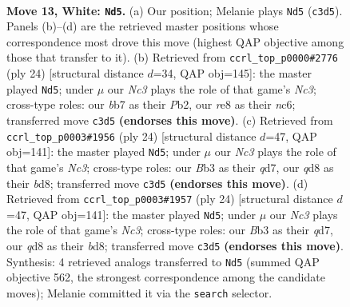 \documentclass[11pt]{article}
\begin{document}
\clearpage

\begin{figure}[p]\centering
\begin{subfigure}{0.46\textwidth}\centering
\resizebox{\linewidth}{!}{%
\newchessgame
\chessboard[
  setfen={r2qrbk1/1bp2pp1/p1np1n1p/1p2p3/4P3/PBNP1N1P/1PPB1PP1/R2QR1K1 w - - 3 13},
  showmover=false,
  pgfstyle=straightmove, color=movearrow, markmove={c3-d5}
]}
\caption{}
\end{subfigure}\hfill
\begin{subfigure}{0.46\textwidth}\centering
\resizebox{\linewidth}{!}{%
\newchessgame
\chessboard[
  setfen={r3r1k1/1bpqbpp1/p1np1n1p/1p2p3/4P3/PBNP1N1P/1PPB1PP1/R2QR1K1 w - - 0 13},
  showmover=false,
  pgfstyle=straightmove, color=movearrow, markmove={c3-d5}
]}
\caption{}
\end{subfigure}
\\[4pt]
\begin{subfigure}{0.46\textwidth}\centering
\resizebox{\linewidth}{!}{%
\newchessgame
\chessboard[
  setfen={r2br1k1/1bpq1ppp/p1np1n2/1p2p3/4P3/PBNP1N1P/1PPB1PP1/R2QR1K1 w - - 3 13},
  showmover=false,
  pgfstyle=straightmove, color=movearrow, markmove={c3-d5}
]}
\caption{}
\end{subfigure}\hfill
\begin{subfigure}{0.46\textwidth}\centering
\resizebox{\linewidth}{!}{%
\newchessgame
\chessboard[
  setfen={r2br1k1/1bpq1ppp/p1np1n2/1p2p3/4P3/PBNP1N1P/1PPB1PP1/R2QR1K1 w - - 3 13},
  showmover=false,
  pgfstyle=straightmove, color=movearrow, markmove={c3-d5}
]}
\caption{}
\end{subfigure}
\caption{\textbf{Move 13, White: \texttt{Nd5}.} (a) Our position; Melanie plays \texttt{Nd5} (\texttt{c3d5}). Panels (b)--(d) are the retrieved master positions whose correspondence most drove this move (highest QAP objective among those that transfer to it). (b) Retrieved from \texttt{ccrl\_top\_p0000\#2776} (ply 24) [structural distance $d$=34, QAP obj=145]: the master played \texttt{Nd5}; under $\mu$ our \emph{Nc3} plays the role of that game's \emph{Nc3}; cross-type roles: our \emph{b}b7 as their \emph{P}b2, our \emph{r}e8 as their \emph{n}c6; transferred move \texttt{c3d5} \textbf{(endorses this move)}. (c) Retrieved from \texttt{ccrl\_top\_p0003\#1956} (ply 24) [structural distance $d$=47, QAP obj=141]: the master played \texttt{Nd5}; under $\mu$ our \emph{Nc3} plays the role of that game's \emph{Nc3}; cross-type roles: our \emph{B}b3 as their \emph{q}d7, our \emph{q}d8 as their \emph{b}d8; transferred move \texttt{c3d5} \textbf{(endorses this move)}. (d) Retrieved from \texttt{ccrl\_top\_p0003\#1957} (ply 24) [structural distance $d$=47, QAP obj=141]: the master played \texttt{Nd5}; under $\mu$ our \emph{Nc3} plays the role of that game's \emph{Nc3}; cross-type roles: our \emph{B}b3 as their \emph{q}d7, our \emph{q}d8 as their \emph{b}d8; transferred move \texttt{c3d5} \textbf{(endorses this move)}. Synthesis: 4 retrieved analogs transferred to \texttt{Nd5} (summed QAP objective 562, the strongest correspondence among the candidate moves); Melanie committed it via the \texttt{search} selector.}
\label{fig:thought-m24}
\end{figure}
\end{document}
